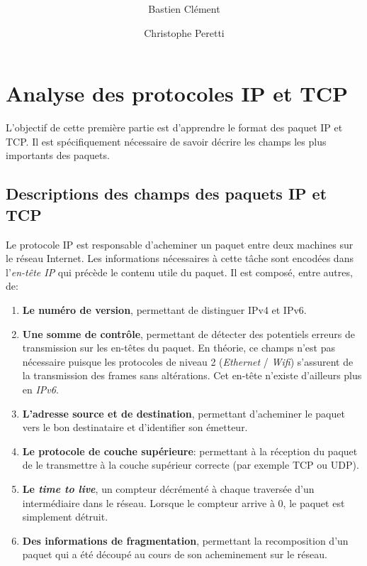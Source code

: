 \documentclass[11pt,a4paper]{article}
\author{Bastien Clément \and Christophe Peretti}
\title{{\normalsize \doccourse} \\ \doctitle }
\begin{document}
\maketitle
\vspace{1em}

\section{Analyse des protocoles IP et TCP}

L'objectif de cette première partie est d'apprendre le format des paquet IP et TCP. Il est spécifiquement nécessaire de savoir décrire les champs les plus importants des paquets.

\subsection{Descriptions des champs des paquets IP et TCP}

Le protocole IP est responsable d'acheminer un paquet entre deux machines sur le réseau Internet. Les informations nécessaires à cette tâche sont encodées dans l'\textit{en-tête IP} qui précède le contenu utile du paquet. Il est composé, entre autres, de:

\begin{enumerate}
	\item \textbf{Le numéro de version}, permettant de distinguer IPv4 et IPv6.
	\item \textbf{Une somme de contrôle}, permettant de détecter des potentiels erreurs de transmission sur les en-têtes du paquet. En théorie, ce champs n'est pas nécessaire puisque les protocoles de niveau 2 (\textit{Ethernet} / \textit{Wifi}) s'assurent de la transmission des frames sans altérations. Cet en-tête n'existe d'ailleurs plus en \textit{IPv6}.
	\item \textbf{L'adresse source et de destination}, permettant d'acheminer le paquet vers le bon destinataire et d'identifier son émetteur.
	\item \textbf{Le protocole de couche supérieure}: permettant à la réception du paquet de le transmettre à la couche supérieur correcte (par exemple TCP ou UDP).
	\item \textbf{Le \textit{time to live}}, un compteur décrémenté à chaque traversée d'un intermédiaire dans le réseau. Lorsque le compteur arrive à 0, le paquet est simplement détruit.
	\item \textbf{Des informations de fragmentation}, permettant la recomposition d'un paquet qui a été découpé au cours de son acheminement sur le réseau.
\end{enumerate}
\end{document}

